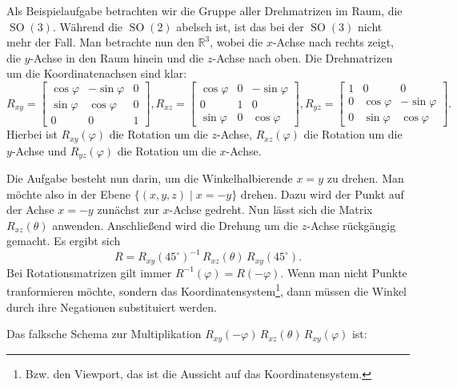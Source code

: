 \documentclass[a4paper,11pt,fleqn,twoside]{scrartcl}
\numberwithin{equation}{section}
\newcommand{\R}{\mathbb R}
\theoremstyle{rmbox}
\begin{document}
Als Beispielaufgabe betrachten wir die Gruppe aller Drehmatrizen
im Raum, die $\operatorname{SO}(3)$. Während die $\operatorname{SO}(2)$
abelsch ist, ist das bei der $\operatorname{SO}(3)$ nicht mehr
der Fall. Man betrachte nun den $\R^3$, wobei die $x$-Achse nach
rechts zeigt, die $y$-Achse in den Raum hinein und die $z$-Achse
nach oben. Die Drehmatrizen um die Koordinatenachsen sind klar:
\begin{equation}
R_{xy} = \begin{bmatrix}
\cos\varphi & -\sin\varphi & 0\\
\sin\varphi & \cos\varphi & 0\\
0 & 0 & 1
\end{bmatrix},
R_{xz} = \begin{bmatrix}
\cos\varphi & 0 & -\sin\varphi\\
0 & 1 & 0\\
\sin\varphi & 0 & \cos\varphi
\end{bmatrix},
R_{yz} = \begin{bmatrix}
1 & 0 & 0\\
0 & \cos\varphi & -\sin\varphi\\
0 & \sin\varphi & \cos\varphi
\end{bmatrix}.
\end{equation}
Hierbei ist $R_{xy}(\varphi)$ die Rotation um die $z$-Achse,
$R_{xz}(\varphi)$ die Rotation um die $y$-Achse und
$R_{yz}(\varphi)$ die Rotation um die $x$-Achse.

Die Aufgabe besteht nun darin, um die Winkelhalbierende $x=y$ zu
drehen. Man möchte also in der Ebene $\{(x,y,z)\mid x=-y\}$ drehen.
Dazu wird der Punkt auf der Achse $x=-y$ zunächst zur $x$-Achse
gedreht. Nun lässt sich die Matrix $R_{xz}(\theta)$ anwenden.
Anschließend wird die Drehung um die $z$-Achse rückgängig gemacht.
Es ergibt sich
\begin{equation}
R = R_{xy}(45^\circ)^{-1}\,R_{xz}(\theta)\,R_{xy}(45^\circ).
\end{equation}
Bei Rotationsmatrizen gilt immer $R^{-1}(\varphi)=R(-\varphi)$.
Wenn man nicht Punkte tranformieren möchte, sondern das
Koordinatensystem\footnote{Bzw. den Viewport, das ist die Aussicht
auf das Koordinatensystem.}, dann müssen die Winkel durch ihre
Negationen substituiert werden.

Das falksche Schema zur Multiplikation
$R_{xy}(-\varphi)\,R_{xz}(\theta)\,R_{xy}(\varphi)$ ist:
\end{document}
